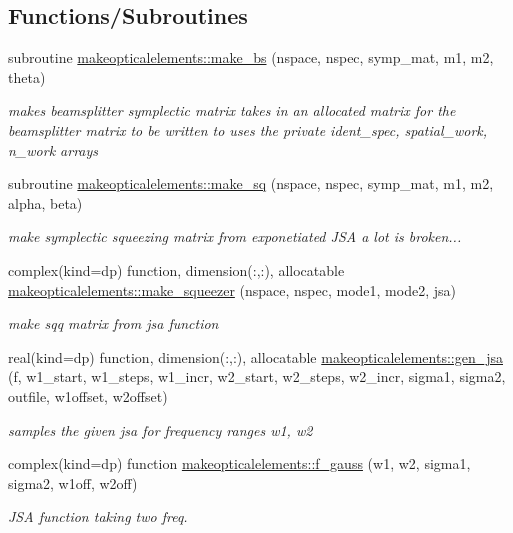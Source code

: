 \subsection*{Functions/\+Subroutines}
\begin{DoxyCompactItemize}
\item 
subroutine \hyperlink{namespacemakeopticalelements_a593a6ee34afdeebc8b4667791c8a144f}{makeopticalelements\+::make\+\_\+bs} (nspace, nspec, symp\+\_\+mat, m1, m2, theta)
\begin{DoxyCompactList}\small\item\em makes beamsplitter symplectic matrix  takes in an allocated matrix for the beamsplitter matrix to be written to uses the private ident\+\_\+spec, spatial\+\_\+work, n\+\_\+work arrays \end{DoxyCompactList}\item 
subroutine \hyperlink{namespacemakeopticalelements_a6658c2ce879c0bc4b2e5918064a6a308}{makeopticalelements\+::make\+\_\+sq} (nspace, nspec, symp\+\_\+mat, m1, m2, alpha, beta)
\begin{DoxyCompactList}\small\item\em make symplectic squeezing matrix from exponetiated J\+SA  a lot is broken... \end{DoxyCompactList}\item 
complex(kind=dp) function, dimension(\+:,\+:), allocatable \hyperlink{namespacemakeopticalelements_ae72bdfe443e711e230a7bf9c19d827d4}{makeopticalelements\+::make\+\_\+squeezer} (nspace, nspec, mode1, mode2, jsa)
\begin{DoxyCompactList}\small\item\em make sqq matrix from jsa function \end{DoxyCompactList}\item 
real(kind=dp) function, dimension(\+:,\+:), allocatable \hyperlink{namespacemakeopticalelements_a230fa3e5fad58bf78ec6aecff5747ca6}{makeopticalelements\+::gen\+\_\+jsa} (f, w1\+\_\+start, w1\+\_\+steps, w1\+\_\+incr, w2\+\_\+start, w2\+\_\+steps, w2\+\_\+incr, sigma1, sigma2, outfile, w1offset, w2offset)
\begin{DoxyCompactList}\small\item\em samples the given jsa for frequency ranges w1, w2 \end{DoxyCompactList}\item 
complex(kind=dp) function \hyperlink{namespacemakeopticalelements_ae29454e6b6a33b50212c3af0c275173a}{makeopticalelements\+::f\+\_\+gauss} (w1, w2, sigma1, sigma2, w1off, w2off)
\begin{DoxyCompactList}\small\item\em J\+SA function taking two freq. \end{DoxyCompactList}\item 

\end{DoxyCompactItemize}
